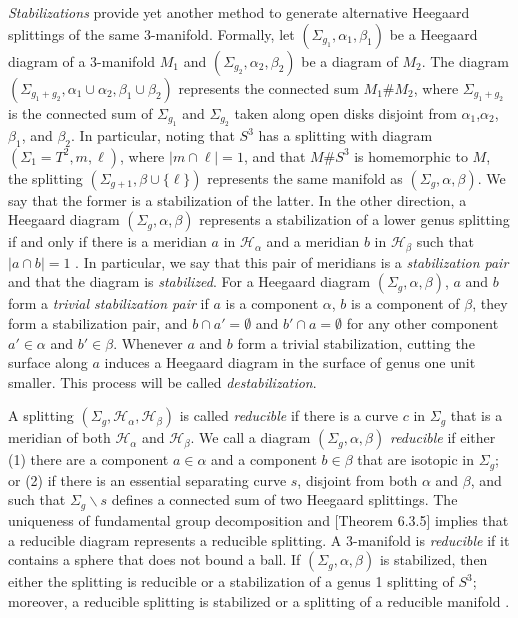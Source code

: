 \documentclass[11pt]{amsart}
\numberwithin{equation}{section}
\theoremstyle{plain}
\theoremstyle{definition}
\begin{document}
\emph{Stabilizations} provide yet another method to generate alternative Heegaard splittings of the same 3-manifold. 
Formally, let $(\Sigma_{g_1},\alpha_1,\beta_1)$ be a Heegaard diagram of a 3-manifold $M_1$ and $(\Sigma_{g_2},\alpha_2,\beta_2)$ be a diagram of $M_2$. 
The diagram $(\Sigma_{g_1+g_2},\alpha_1\cup\alpha_2,\beta_1\cup \beta_2)$ represents the connected sum $M_1\#M_2$, where $\Sigma_{g_1+g_2}$ is the connected sum of $\Sigma_{g_1}$ and $\Sigma_{g_2}$ taken along open disks disjoint from $\alpha_1$,$\alpha_2$, $\beta_1$, and $\beta_2$.
In particular, noting that $S^3$ has a splitting with diagram $(\Sigma_1=T^2,m,\ell)$, where $|m\cap \ell|=1$, and that $M\#S^3$ is homemorphic to $M$, the splitting $(\Sigma_{g+1},\beta\cup\{\ell\})$ represents the same manifold as $(\Sigma_g,\alpha,\beta)$.
We say that the former is a {stabilization} of the latter.
In the other direction, a Heegaard diagram $(\Sigma_g,\alpha,\beta)$ represents a stabilization of a lower genus splitting if and only if there is a meridian $a$ in $\mathcal{H}_\alpha$ and a meridian $b$ in $\mathcal{H}_\beta$ such that $|a\cap b|=1$ \cite{johnson2006notes}. 
In particular, we say that this pair of meridians is a \textit{stabilization pair} and that the diagram is \textit{stabilized}. 
For a Heegaard diagram $(\Sigma_g,\alpha,\beta)$, $a$ and $b$ form a \textit{trivial stabilization pair} if $a$ is a component $ \alpha$, $b$ is a component of $\beta$, they form a stabilization pair, and $b\cap a'=\emptyset$ and $b'\cap a = \emptyset$ for any other component $a'\in\alpha$ and $b'\in\beta$. 
Whenever $a$ and $b$ form a trivial stabilization, cutting the surface along $a$ induces a Heegaard diagram in the surface of genus one unit smaller.
This process will be called \textit{destabilization}.
 
A splitting $(\Sigma_g,\mathcal{H}_\alpha,\mathcal{H}_\beta)$ is called \textit{reducible} if there is a curve $c$ in $\Sigma_g$ that is a meridian of both $\mathcal{H}_\alpha$ and $\mathcal{H}_\beta$. 
We call a diagram $(\Sigma_g, \alpha,\beta)$ \textit{reducible} if either (1) there are a component $a\in \alpha$ and a component $b\in \beta$ that are isotopic in $\Sigma_g$; or (2) if there is an essential separating curve $s$, disjoint from both $\alpha$ and $\beta$, and such that $\Sigma_g\backslash s$ defines a connected sum of two Heegaard splittings. 
The uniqueness of fundamental group decomposition \cite{aschenbrenner20153} and \cite{schultens2014introduction}[Theorem 6.3.5] implies that a reducible diagram represents a reducible splitting.
A 3-manifold is \emph{reducible} if it contains a sphere that does not bound a ball. 
If $(\Sigma_g,\alpha,\beta)$ is stabilized, then either the splitting is reducible or a stabilization of a genus 1 splitting of $S^3$; moreover, a reducible splitting is stabilized or a splitting of a reducible manifold \cite{johnson2006notes}.
\end{document}
